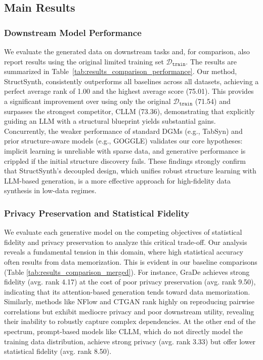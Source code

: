 \subsection{Main Results}
\subsubsection{Downstream Model Performance}
We evaluate the generated data on downstream tasks and, for comparison, also report results using the original limited training set $\mathcal{D}_\mathtt{train}$. The results are summarized in Table~\ref{tab:results_comparison_performance}. Our method, \textsf{StructSynth}, consistently outperforms all baselines across all datasets, achieving a perfect average rank of 1.00 and the highest average score (75.01). This provides a significant improvement over using only the original $\mathcal{D}_\mathtt{train}$ (71.54) and surpasses the strongest competitor, CLLM (73.36), demonstrating that explicitly guiding an LLM with a structural blueprint yields substantial gains. Concurrently, the weaker performance of standard DGMs (e.g., TabSyn) and prior structure-aware models (e.g., GOGGLE) validates our core hypotheses: implicit learning is unreliable with sparse data, and generative performance is crippled if the initial structure discovery fails. These findings strongly confirm that \textsf{StructSynth}'s decoupled design, which unifies robust structure learning with LLM-based generation, is a more effective approach for high-fidelity data synthesis in low-data regimes.



\subsubsection{Privacy Preservation and Statistical Fidelity }

We evaluate each generative model on the competing objectives of statistical fidelity and privacy preservation to analyze this critical trade-off. Our analysis reveals a fundamental tension in this domain, where high statistical accuracy often results from data memorization. This is evident in our baseline comparisons (Table \ref{tab:results_comparison_merged}). For instance, GraDe achieves strong fidelity (avg. rank 4.17) at the cost of poor privacy preservation (avg. rank 9.50), indicating that its attention-based generation tends toward data memorization. Similarly, methods like NFlow and CTGAN rank highly on reproducing pairwise correlations but exhibit mediocre privacy and poor downstream utility, revealing their inability to robustly capture complex dependencies. At the other end of the spectrum, prompt-based models like CLLM, which do not directly model the training data distribution, achieve strong privacy (avg. rank 3.33) but offer lower statistical fidelity (avg. rank 8.50).

